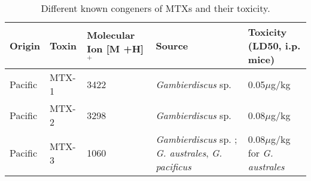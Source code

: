 \documentclass[12pt]{article}
\begin{document}

\begin{table}
\caption{Different known congeners of MTXs and their toxicity.}
\label{tbl:MTXTable}
\begin{tabular}{ |  p{2cm} | p{2cm} | p{3cm} | p{3cm} | p{4cm} | }
\hline
\textbf{Origin} & \textbf{Toxin} & \textbf{Molecular Ion [M +H]$^{+}$} & \textbf{Source} & \textbf{Toxicity (LD50, i.p. mice)} \\
\hline
 Pacific & MTX-1 & 3422 \cite{holmes1994purification,murata1993structure} & \emph{Gambierdiscus} sp. \cite{holmes1994purification} & 0.05$\mu$g/kg \cite{murata1993structure}\\
 \hline
 Pacific & MTX-2 & 3298 \cite{holmes1994purification} & \emph{Gambierdiscus} sp. \cite{holmes1994purification} & 0.08$\mu$g/kg \cite{holmes1994purification}\\
 \hline
 Pacific & MTX-3 & 1060   \cite{holmes1994purification} & \emph{Gambierdiscus} sp. \cite{holmes1994purification}; \emph{G. australes}, \emph{G. pacificus} \cite{rhodes2014production} &  0.08$\mu$g/kg for \emph{G. australes}  \cite{rhodes2014production} \\
 \hline
\end{tabular}
\end{table}
\FloatBarrier
\end{document}
